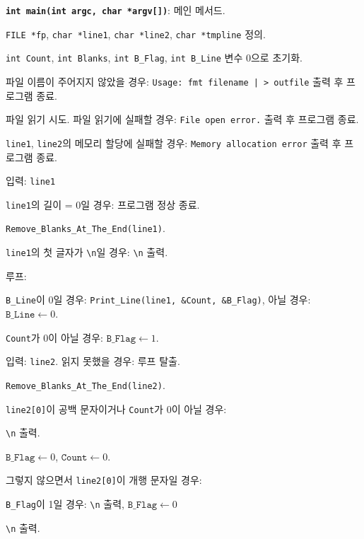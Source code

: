 \textbf{\texttt{int main(int argc, char *argv[])}}: 메인 메서드.
\begin{algorithm}
	\item \texttt{FILE *fp}, \texttt{char *line1}, \texttt{char *line2}, \texttt{char *tmpline} 정의.
	\item \texttt{int Count}, \texttt{int Blanks}, \texttt{int B_Flag}, \texttt{int B_Line} 변수 0으로 초기화.	
	\item 파일 이름이 주어지지 않았을 경우: \texttt{Usage: fmt filename | > outfile} 출력 후 프로그램 종료.
	\item 파일 읽기 시도. 파일 읽기에 실패할 경우: \texttt{File open error.} 출력 후 프로그램 종료.
	\item \texttt{line1}, \texttt{line2}의 메모리 할당에 실패할 경우: \texttt{Memory allocation error} 출력 후 프로그램 종료.
	\item 입력: \texttt{line1}
	\item \texttt{line1}의 길이 = 0일 경우: 프로그램 정상 종료.
	\item \texttt{Remove_Blanks_At_The_End(line1)}.
	\item \texttt{line1}의 첫 글자가 \texttt{\textbackslash{}n}일 경우: \texttt{\textbackslash{}n} 출력.
	\item 루프:
			\begin{algorithm}
				\item \texttt{B_Line}이 0일 경우: \texttt{Print_Line(line1, \&Count, \&B_Flag)}, 아닐 경우: $\texttt{B_Line} \leftarrow 0$.
				\item \texttt{Count}가 0이 아닐 경우: $\texttt{B_Flag} \leftarrow 1$.
				\item 입력: \texttt{line2}. 읽지 못했을 경우: 루프 탈출.
				\item \texttt{Remove_Blanks_At_The_End(line2)}.
				\item \texttt{line2[0]}이 공백 문자이거나 \texttt{Count}가 0이 아닐 경우:
					\begin{algorithm}
						\item \texttt{\textbackslash{}n} 출력.
						\item $\texttt{B_Flag} \leftarrow 0$, $\texttt{Count} \leftarrow 0$.
					\end{algorithm}
				\item 그렇지 않으면서 \texttt{line2[0]}이 개행 문자일 경우:
					\begin{algorithm}
						\item \texttt{B_Flag}이 1일 경우: \texttt{\textbackslash{}n} 출력, $\texttt{B_Flag} \leftarrow 0$
						\item \texttt{\textbackslash{}n} 출력.

\end{algorithm}
\end{algorithm}
\end{algorithm}
